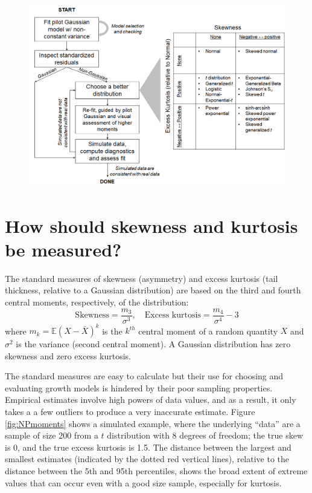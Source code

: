 \documentclass[11pt]{article}
\newcounter{box}
\newcommand{\be}{\begin{equation}}
\newcommand{\ee}{\end{equation}}
\begin{document}
{\begin{figure}
\centering
\includegraphics[width=\textwidth]{figures/workflow}
\caption{}
\label{fig:workflow}
\end{figure} 

\section{How should skewness and kurtosis be measured?}
The standard measures of skewness (asymmetry) and excess kurtosis (tail thickness, relative 
to a Gaussian distribution) are based on the third and fourth central moments, respectively, of the distribution: 
\be
\mbox{Skewness} = \frac{m_3}{\sigma^3}, \quad \mbox{Excess kurtosis} = \frac{m_4}{\sigma^4}-3
\ee
where $m_k = \mathbb{E}(X - \bar{X})^k$ is the $k^{th}$ central moment of a random quantity $X$ 
and $\sigma^2$ is the variance (second central moment). A Gaussian distribution has zero skewness 
and zero excess kurtosis. 

The standard measures are easy to calculate but their use for choosing and evaluating growth models is hindered by their
poor sampling properties. Empirical estimates involve high powers of data values, and as a result, it only takes a 
a few outliers to produce a very inaccurate estimate. Figure \ref{fig:NPmoments} shows a simulated example, where the
underlying ``data'' are a sample of size 200 from a $t$ distribution with 8 degrees of freedom; the true skew is 0, and the 
true excess kurtosis is 1.5. The distance between the largest and smallest estimates (indicated by the dotted red
vertical lines), relative to the distance between the 5th and 95th percentiles, shows the broad extent of 
extreme values that can occur even with a good size sample, especially for kurtosis. 

}
\end{document}
